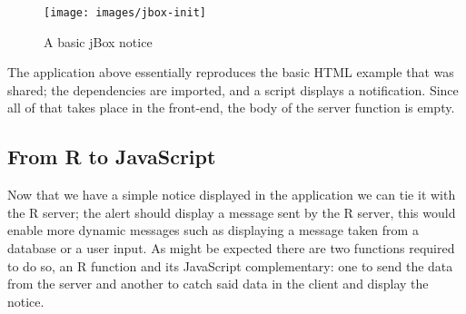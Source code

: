 \documentclass[10pt,]{krantz}
\makeatletter
\newenvironment{Shaded}{\begin{snugshade}}{\end{snugshade}}
\newcommand{\ControlFlowTok}[1]{\textcolor[rgb]{0.27,0.27,0.27}{\textbf{#1}}}
\newcommand{\DataTypeTok}[1]{\textcolor[rgb]{0.27,0.27,0.27}{#1}}
\newcommand{\KeywordTok}[1]{\textcolor[rgb]{0.27,0.27,0.27}{\textbf{#1}}}
\newcommand{\NormalTok}[1]{#1}
\newcommand{\OperatorTok}[1]{\textcolor[rgb]{0.43,0.43,0.43}{\textbf{#1}}}
\newcommand{\StringTok}[1]{\textcolor[rgb]{0.5,0.5,0.5}{#1}}
\newenvironment{kframe}{%
\medskip{}
\setlength{\fboxsep}{.8em}
 \def\at@end@of@kframe{}%
 \ifinner\ifhmode%
  \def\at@end@of@kframe{\end{minipage}}%
  \begin{minipage}{\columnwidth}%
 \fi\fi%
 \def\FrameCommand##1{\hskip\@totalleftmargin \hskip-\fboxsep
 \colorbox{shadecolor}{##1}\hskip-\fboxsep
     \hskip-\linewidth \hskip-\@totalleftmargin \hskip\columnwidth}%
 \MakeFramed {\advance\hsize-\width
   \@totalleftmargin\z@ \linewidth\hsize
   \@setminipage}}%
 {\par\unskip\endMakeFramed%
 \at@end@of@kframe}
\renewenvironment{Shaded}{\begin{kframe}}{\end{kframe}}
\makeatother
\begin{document}
\begin{Shaded}
\end{Shaded}

\begin{figure}[H]

{\centering \texttt{[image: images/jbox-init]} 

}

\caption{A basic jBox notice}\label{fig:jbox-init}
\end{figure}

The application above essentially reproduces the basic HTML example that was shared; the dependencies are imported, and a script displays a notification. Since all of that takes place in the front-end, the body of the server function is empty.

\hypertarget{shiny-intro-r-to-js}{%
\subsection{From R to JavaScript}\label{shiny-intro-r-to-js}}

Now that we have a simple notice displayed in the application we can tie it with the R server; the alert should display a message sent by the R server, this would enable more dynamic messages such as displaying a message taken from a database or a user input. As might be expected there are two functions required to do so, an R function and its JavaScript complementary: one to send the data from the server and another to catch said data in the client and display the notice.
\end{document}
